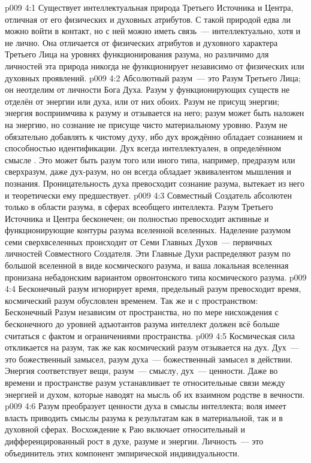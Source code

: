 \vs p009 4:1 Существует интеллектуальная природа Третьего Источника и Центра, отличная от его физических и духовных атрибутов. С такой природой едва ли можно войти в контакт, но с ней можно иметь связь~--- интеллектуально, хотя и не лично. Она отличается от физических атрибутов и духовного характера Третьего Лица на уровнях функционирования разума, но различимо для личностей эта природа никогда не функционирует независимо от физических или духовных проявлений.
\vs p009 4:2 Абсолютный разум~--- это Разум Третьего Лица; он неотделим от личности Бога Духа. Разум у функционирующих существ не отделён от энергии или духа, или от них обоих. Разум не присущ энергии; энергия восприимчива к разуму и отзывается на него; разум может быть наложен на энергию, но сознание не присуще чисто материальному уровню. Разум не обязательно добавлять к чистому духу, ибо дух врождённо обладает сознанием и способностью идентификации. Дух всегда интеллектуален, в определённом смысле . Это может быть разум того или иного типа, например, предразум или сверхразум, даже дух\hyp{}разум, но он всегда обладает эквивалентом мышления и познания. Проницательность духа превосходит сознание разума, вытекает из него и теоретически ему предшествует.
\vs p009 4:3 \pc Совместный Создатель абсолютен только в области разума, в сферах всеобщего интеллекта. Разум Третьего Источника и Центра бесконечен; он полностью превосходит активные и функционирующие контуры разума вселенной вселенных. Наделение разумом семи сверхвселенных происходит от Семи Главных Духов~--- первичных личностей Совместного Создателя. Эти Главные Духи распределяют разум по большой вселенной в виде космического разума, и ваша локальная вселенная пронизана небадонским вариантом орвонтонского типа космического разума.
\vs p009 4:4 Бесконечный разум игнорирует время, предельный разум превосходит время, космический разум обусловлен временем. Так же и с пространством: Бесконечный Разум независим от пространства, но по мере нисхождения с бесконечного до уровней адъютантов разума интеллект должен всё больше считаться с фактом и ограничениями пространства.
\vs p009 4:5 \pc Космическая сила откликается на разум, так же как космический разум отзывается на дух. Дух~--- это божественный замысел, разум духа~--- божественный замысел в действии. Энергия соответствует вещи, разум~--- смыслу, дух~--- ценности. Даже во времени и пространстве разум устанавливает те относительные связи между энергией и духом, которые наводят на мысль об их взаимном родстве в вечности.
\vs p009 4:6 Разум преобразует ценности духа в смыслы интеллекта; воля имеет власть приводить смыслы разума к результатам как в материальной, так и в духовной сферах. Восхождение к Раю включает относительный и дифференцированный рост в духе, разуме и энергии. Личность~--- это объединитель этих компонент эмпирической индивидуальности.
